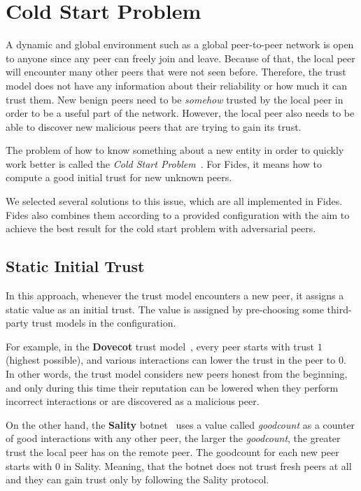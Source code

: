 \section{Cold Start Problem}
\label{sec:cold-start-problem}
A dynamic and global environment such as a global peer-to-peer network is open to anyone since any peer can freely join and leave. Because of that, the local peer will encounter many other peers that were not seen before. Therefore, the trust model does not have any information about their reliability or how much it can trust them. 
New benign peers need to be \textit{somehow} trusted by the local peer in order to be a useful part of the network. However, the local peer also needs to be able to discover new malicious peers that are trying to gain its trust.

The problem of how to know something about a new entity in order to quickly work better is called the \textit{Cold Start Problem}~\cite{christensen2014hybrid}. For Fides, it means how to compute a good initial trust for new unknown peers. 

We selected several solutions to this issue, which are all implemented in Fides. Fides also combines them according to a provided configuration with the aim to achieve the best result for the cold start problem with adversarial peers.

\subsection{Static Initial Trust}
\label{subsec:static-initial-trust}
In this approach, whenever the trust model encounters a new peer, it assigns a static value as an initial trust. The value is assigned by pre-choosing some third-party trust models in the configuration.

For example, in the \textbf{Dovecot} trust model~\cite{dita}, every peer starts with trust $1$ (highest possible), and various interactions can lower the trust in the peer to $0$. In other words, the trust model considers new peers honest from the beginning, and only during this time their reputation can be lowered when they perform incorrect interactions or are discovered as a malicious peer.

On the other hand, the \textbf{Sality} botnet~\cite{falliere2011sality} uses a value called \textit{goodcount} as a counter of good interactions with any other peer, the larger the \textit{goodcount}, the greater trust the local peer has on the remote peer. The goodcount for each new peer starts with $0$ in Sality. Meaning, that the botnet does not trust fresh peers at all and they can gain trust only by following the Sality protocol.

